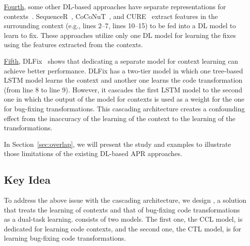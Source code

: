 \underline{Fourth}, some other DL-based approaches have separate
representations for
contexts~\cite{chen2018sequencer,cure-icse21,lutellier2020coconut}.
SequenceR~\cite{chen2018sequencer},
CoCoNuT~\cite{lutellier2020coconut}, and CURE~\cite{cure-icse21}
extract features in the surrounding context (e.g., lines 2--7, lines
10--15) to be fed into a DL model to learn to fix. These approaches
utilize only one DL model for learning the fixes using the features
extracted from the contexts.


\underline{Fifth}, DLFix~\cite{icse20} shows that dedicating a
separate model for context learning can achieve better performance.
DLFix has a two-tier model in which one tree-based LSTM model learns
the context and another one learns the code transformation (from line
8 to line 9). However, it cascades the first LSTM model to the second
one in which the output of the model for contexts is used as a weight
for the one for bug-fixing transformations. This cascading
architecture creates a confounding effect from the inaccuracy of the
learning of the context to the learning of the transformations.

In Section~\ref{sec:overlap}, we will present the study and examples
to illustrate those limitations of the existing DL-based APR approaches.

\subsection{Key Idea}
\label{sec:key-idea}

To address the above issue with the cascading architecture, we design
{\tool}, a solution that treats the learning of contexts and that of
bug-fixing code transformations as a dual-task learning. {\tool}
consists of two models. The first one, the CCL model, is
dedicated for learning code contexts, and the second one, the
CTL model, is for learning bug-fixing code transformations.



